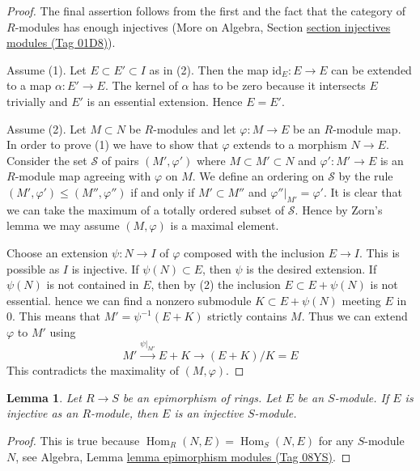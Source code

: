 \documentclass{amsart}
\theoremstyle{plain}
\newtheorem{lemma}[subsection]{Lemma}
\theoremstyle{definition}
\theoremstyle{remark}
\numberwithin{equation}{subsection}
\def\Hom{\mathop{\mathrm{Hom}}\nolimits}
\begin{document}
\begin{proof}
The final assertion follows from the first and the fact that the
category of $R$-modules has enough injectives
(More on Algebra, Section \href{https://stacks.math.columbia.edu/tag/01D8}{section injectives modules (Tag 01D8)}).

\medskip\noindent
Assume (1). Let $E \subset E' \subset I$ as in (2).
Then the map $\text{id}_E : E \to E$ can be extended
to a map $\alpha : E' \to E$. The kernel of $\alpha$ has to be
zero because it intersects $E$ trivially and $E'$ is an essential
extension. Hence $E = E'$.

\medskip\noindent
Assume (2). Let $M \subset N$ be $R$-modules and let $\varphi : M \to E$
be an $R$-module map. In order to prove (1) we have to show that
$\varphi$ extends to a morphism $N \to E$. Consider the set $\mathcal{S}$
of pairs
$(M', \varphi')$ where $M \subset M' \subset N$ and $\varphi' : M' \to E$
is an $R$-module map agreeing with $\varphi$ on $M$. We define an ordering
on $\mathcal{S}$ by the rule $(M', \varphi') \leq (M'', \varphi'')$
if and only if $M' \subset M''$ and $\varphi''|_{M'} = \varphi'$.
It is clear that we can take the maximum of a totally ordered subset
of $\mathcal{S}$. Hence by Zorn's lemma we may assume $(M, \varphi)$
is a maximal element.

\medskip\noindent
Choose an extension $\psi : N \to I$ of $\varphi$ composed
with the inclusion $E \to I$. This is possible as $I$ is injective.
If $\psi(N) \subset E$, then $\psi$ is the desired extension.
If $\psi(N)$ is not contained in $E$, then by (2) the inclusion
$E \subset E + \psi(N)$ is not essential. hence
we can find a nonzero submodule $K \subset E + \psi(N)$ meeting $E$ in $0$.
This means that $M' = \psi^{-1}(E + K)$ strictly contains $M$.
Thus we can extend $\varphi$ to $M'$ using
$$
M' \xrightarrow{\psi|_{M'}} E + K \to (E + K)/K = E
$$
This contradicts the maximality of $(M, \varphi)$.
\end{proof}


\begin{lemma}
\label{lemma-injective-epimorphism}
Let $R \to S$ be an epimorphism of rings. Let $E$ be an $S$-module.
If $E$ is injective as an $R$-module, then $E$ is an injective $S$-module.
\end{lemma}

\begin{proof}
This is true because $\Hom_R(N, E) = \Hom_S(N, E)$ for any $S$-module $N$,
see Algebra, Lemma \href{https://stacks.math.columbia.edu/tag/08YS}{lemma epimorphism modules (Tag 08YS)}.
\end{proof}
\end{document}
